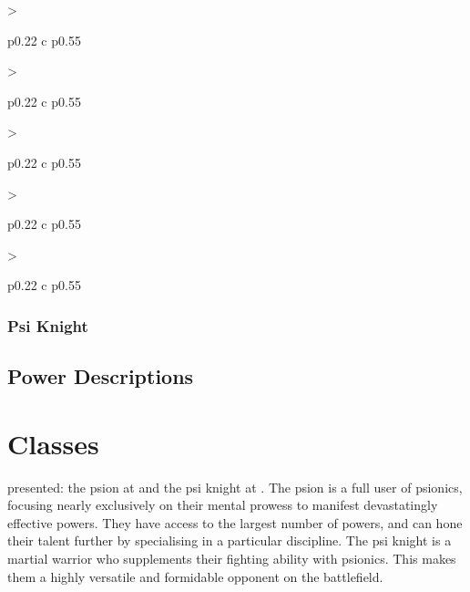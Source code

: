 \DndSetThemeColor[PhbMauve]
\begin{DndTable}[header=Prana Bindu Sublist, bold=false]{
    >{\raggedright\arraybackslash}p{0.22\linewidth} c p{0.55\linewidth}}
    
\end{DndTable}

\DndSetThemeColor[PhbTan]
\begin{DndTable}[header=Voice Sublist, bold=false]{
    >{\raggedright\arraybackslash}p{0.22\linewidth} c p{0.55\linewidth}}
    
\end{DndTable}

\DndSetThemeColor[DmgSlateGrey]
\begin{DndTable}[header=Metacreativity Sublist, bold=false]{
    >{\raggedright\arraybackslash}p{0.22\linewidth} c p{0.55\linewidth}}
    
\end{DndTable}

\DndSetThemeColor[DmgLilac]
\begin{DndTable}[header=Spacefolding Sublist, bold=false]{
    >{\raggedright\arraybackslash}p{0.22\linewidth} c p{0.55\linewidth}}
    
\end{DndTable}

\DndSetThemeColor[PhbLightGreen]
\begin{DndTable}[header=Psychokinesis Sublist, bold=false]{
    >{\raggedright\arraybackslash}p{0.22\linewidth} c p{0.55\linewidth}}
    
\end{DndTable}

\DndSetThemeColor[DmgCoral]
\subsection{Psi Knight}
\begin{dndlongtable}
    
\end{dndlongtable}

\DndSetThemeColor[PhbLightGreen]
\section{Power Descriptions}
\label{sec:power_descriptions}


\chapter{Classes}
\label{chap:classes}
presented: the psion at  and the psi knight at
.
The psion is a full user of psionics,
focusing nearly exclusively on their mental prowess
to manifest devastatingly effective powers.
They have access to the largest number of powers,
and can hone their talent further by specialising
in a particular discipline.
The psi knight is a martial warrior
who supplements their fighting ability with
psionics.
This makes them a highly versatile and formidable
opponent on the battlefield.

